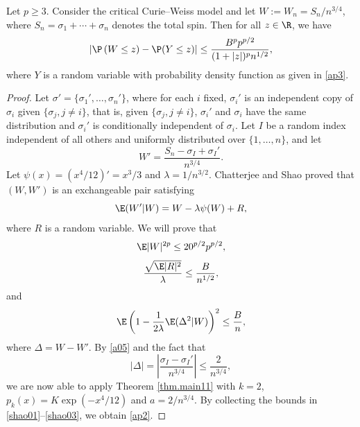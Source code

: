 	\begin{theorem}\label{thm.app1}
		Let $p\ge 3$. Consider the critical Curie--Weiss model and let $W:=W_n=S_n/n^{3/4}$, where
		$S_n=\sigma_1+\cdots+\sigma_n$ denotes the total spin.
		Then for all $z\in\R$, we have
		\begin{equation}\label{ap2}
			\left|\P\left(W\le z\right) -\P(Y\le z)\right| \le \dfrac{B^{p}p^{p/2}}{(1+|z|)^{p} n^{1/2}},
		\end{equation}
		where $Y$ is a random variable with probability density function as given in \eqref{ap3}.
	\end{theorem}
	
	\begin{proof}
		Let $\sigma' = \{\sigma_{1}',\ldots,\sigma_{n}'\}$, 
		where for each $i$ fixed, $\sigma_{i}'$ is an independent copy of $\sigma_{i}$ given $\{\sigma_{j}, j\ne i\}$, 
		that is, given $\{\sigma_{j}, j\ne i\}$,
		$\sigma_{i}'$ and $\sigma_{i}$ have the same distribution and $\sigma_{i}'$ is conditionally independent of $\sigma_{i}$.
		Let $I$ be a random index independent of all others and uniformly distributed over $\{1,\ldots,n\}$, and let
		\[W'= \frac{S_{n} - \sigma_{I}+ \sigma_{I}'}{n^{3/4}}.\]
		Let $\psi(x)=(x^4/12)'=x^{3}/3$ and $\lambda=1/n^{3/2}$.
		Chatterjee and Shao \cite{chatterjee2011nonnormal} proved that $(W,W')$ is an exchangeable pair satisfying
		\begin{equation}\label{a05}
			\E(W'|W) = W-\lambda \psi(W) +R,
		\end{equation} 
		where $R$ is a random variable.
		We will prove that
		\begin{equation}\label{shao01}
			\E|W|^{2p}\le 20^{p/2} p^{p/2},
		\end{equation}
		\begin{equation}\label{shao02}
			\frac{\sqrt{\E|R|^{2}}}{\lambda}\le \frac{B}{n^{1/2}},
		\end{equation}
		and
		\begin{equation}\label{shao03}
			\E\left( 1- \frac{1}{2\lambda}\E({\Delta}^2|W)\right)^2\le \frac{B}{n},
		\end{equation}
		where $\Delta=W-W'$. By \eqref{a05} and the fact that
		\begin{equation}\label{bounded-pair-CurieWeiss}
			|\Delta|=\left|\frac{\sigma_{I}-\sigma_{I}'}{n^{3/4}}\right| \le \frac{2}{n^{3/4}},
		\end{equation}
		we are now able to apply Theorem \ref{thm.main11} with $k=2$, $p_k(x)=K\exp(-x^4/12)$ and $a=2/n^{3/4}$.
		By collecting the bounds in \eqref{shao01}--\eqref{shao03}, we obtain \eqref{ap2}. 
		

\end{proof}
